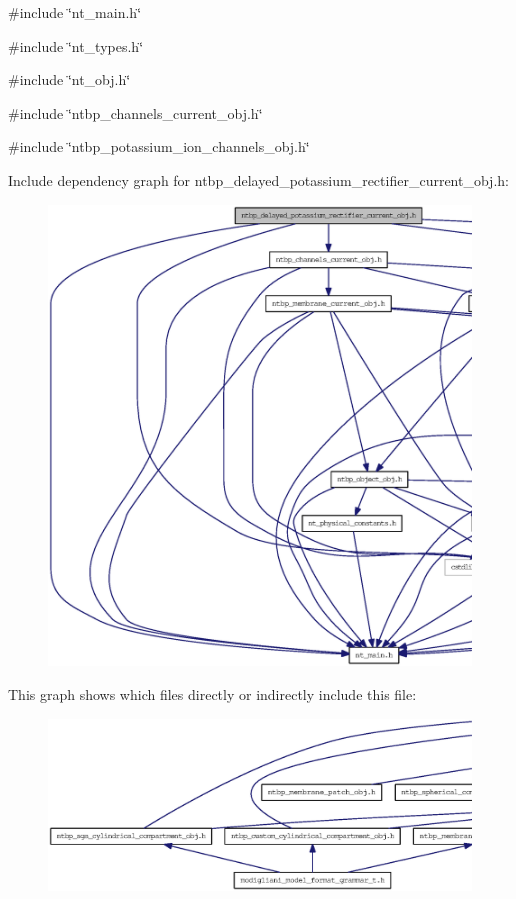 {\ttfamily \#include \char`\"{}nt\_\-main.h\char`\"{}}\par
{\ttfamily \#include \char`\"{}nt\_\-types.h\char`\"{}}\par
{\ttfamily \#include \char`\"{}nt\_\-obj.h\char`\"{}}\par
{\ttfamily \#include \char`\"{}ntbp\_\-channels\_\-current\_\-obj.h\char`\"{}}\par
{\ttfamily \#include \char`\"{}ntbp\_\-potassium\_\-ion\_\-channels\_\-obj.h\char`\"{}}\par
Include dependency graph for ntbp\_\-delayed\_\-potassium\_\-rectifier\_\-current\_\-obj.h:
\nopagebreak
\begin{figure}[H]
\begin{center}
\leavevmode
\includegraphics[width=400pt]{ntbp__delayed__potassium__rectifier__current__obj_8h__incl}
\end{center}
\end{figure}
This graph shows which files directly or indirectly include this file:
\nopagebreak
\begin{figure}[H]
\begin{center}
\leavevmode
\includegraphics[width=400pt]{ntbp__delayed__potassium__rectifier__current__obj_8h__dep__incl}
\end{center}
\end{figure}
